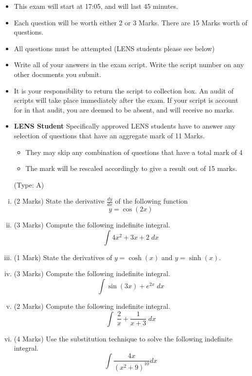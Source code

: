 \documentclass[11pt]{article} %
\begin{document}
	\begin{itemize} 
		\item This exam will start at 17:05, and will last 45 minutes.
		
		\item Each question will be worth either 2 or 3 Marks. There are 15 Marks worth of questions.
		\item All questions must be attempted (LENS students please see below)
		
		\item Write all of your answers in the exam script. Write the script number on any other documents you submit.
		
		\item It is your responsibility to return the script to collection box. An audit of scripts will take place immediately after the exam. If your script is account for in that audit,  you are deemed to be absent, and will receive no marks.
		
		\item \textbf{LENS Student}
		Specifically approved LENS students have to answer any selection of questions that have an aggregate mark of 11 Marks.  
		\begin{itemize}
			\item They may skip any combination of questions that have a total mark of 4
			\item The mark will be rescaled accordingly to give a result out of 15 marks.
		\end{itemize}
		(Type: A)		
		
	\end{itemize}
\newpage
\begin{enumerate}[(i)]
	
	\item (2 Marks) State the derivative $\displaystyle \frac{dy}{dx}$ of the following function
	\[y = \cos(2x)\]
	\item (3 Marks) Compute the following indefinite integral.
	\[ \int 4x^2 + 3x + 2 \; dx \]
	
\newpage	
	\item (1 Mark) State the derivatives of 
	$y = \cosh (x)$ and $y = \sinh(x)$.
\bigskip
	\item (3 Marks) Compute the following indefinite integral.
			\[ \int \sin(3x)  + e^{2x} \; dx \]

\newpage
	\item (2 Marks) Compute the following indefinite integral.
{\Large	\[  \int  \; \frac{2}{x} + \frac{1}{x+3} \; dx\]
}
\bigskip

\newpage
	\item (4 Marks) Use the substitution technique to solve the following indefinite integral.
		\[  \int  \frac{4x}{(x^2+9)^{10} } dx\]
\end{enumerate}

\end{document}
